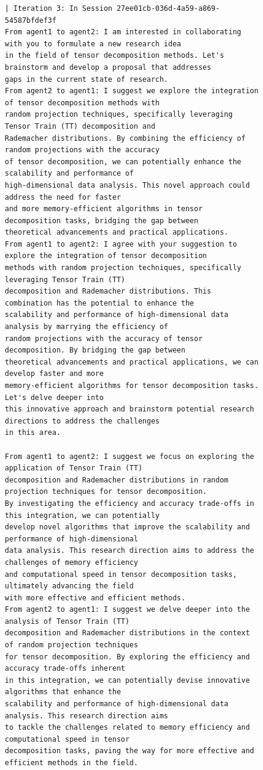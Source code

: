 \begin{figure}[htbp]
\begin{tcolorbox}[
    title=\textbf{Good Communication Case \#1},
    colback=red!1!white,
    colframe=red!50!black,
    fonttitle=\bfseries
]
\begin{verbatim}
| Iteration 3: In Session 27ee01cb-036d-4a59-a869-54587bfdef3f 
From agent1 to agent2: I am interested in collaborating with you to formulate a new research idea 
in the field of tensor decomposition methods. Let's brainstorm and develop a proposal that addresses 
gaps in the current state of research.
From agent2 to agent1: I suggest we explore the integration of tensor decomposition methods with 
random projection techniques, specifically leveraging Tensor Train (TT) decomposition and 
Rademacher distributions. By combining the efficiency of random projections with the accuracy 
of tensor decomposition, we can potentially enhance the scalability and performance of 
high-dimensional data analysis. This novel approach could address the need for faster 
and more memory-efficient algorithms in tensor decomposition tasks, bridging the gap between 
theoretical advancements and practical applications.
From agent1 to agent2: I agree with your suggestion to explore the integration of tensor decomposition 
methods with random projection techniques, specifically leveraging Tensor Train (TT) 
decomposition and Rademacher distributions. This combination has the potential to enhance the 
scalability and performance of high-dimensional data analysis by marrying the efficiency of 
random projections with the accuracy of tensor decomposition. By bridging the gap between 
theoretical advancements and practical applications, we can develop faster and more 
memory-efficient algorithms for tensor decomposition tasks. Let's delve deeper into 
this innovative approach and brainstorm potential research directions to address the challenges 
in this area.

From agent1 to agent2: I suggest we focus on exploring the application of Tensor Train (TT) 
decomposition and Rademacher distributions in random projection techniques for tensor decomposition. 
By investigating the efficiency and accuracy trade-offs in this integration, we can potentially 
develop novel algorithms that improve the scalability and performance of high-dimensional 
data analysis. This research direction aims to address the challenges of memory efficiency 
and computational speed in tensor decomposition tasks, ultimately advancing the field 
with more effective and efficient methods.
From agent2 to agent1: I suggest we delve deeper into the analysis of Tensor Train (TT) 
decomposition and Rademacher distributions in the context of random projection techniques 
for tensor decomposition. By exploring the efficiency and accuracy trade-offs inherent 
in this integration, we can potentially devise innovative algorithms that enhance the 
scalability and performance of high-dimensional data analysis. This research direction aims 
to tackle the challenges related to memory efficiency and computational speed in tensor 
decomposition tasks, paving the way for more effective and efficient methods in the field.
\end{verbatim}


\end{tcolorbox}
\end{figure}
